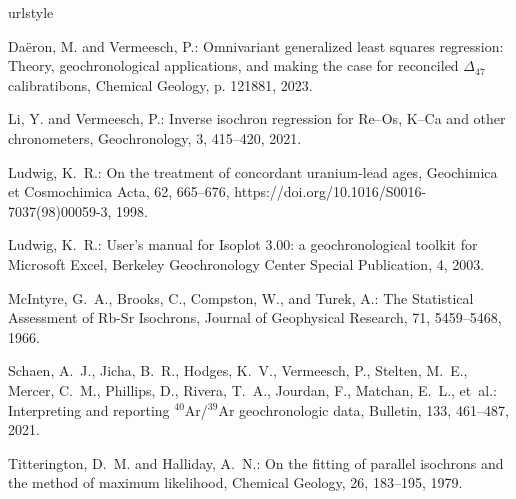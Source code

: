 \documentclass{article}
\begin{document}
%
%

\begin{thebibliography}{10}
\providecommand{\natexlab}[1]{#1}
\providecommand{\url}[1]{\texttt{#1}}
\providecommand{\urlprefix}{}
\expandafter\ifx\csname urlstyle\endcsname\relax
  \providecommand{\doi}[1]{https://doi.org/\discretionary{}{}{}#1}\else
  \providecommand{\doi}{https://doi.org/\discretionary{}{}{}\begingroup
  \urlstyle{rm}\Url}\fi

Da{\"e}ron, M. and Vermeesch, P.: {Omnivariant generalized least squares
  regression: Theory, geochronological applications, and making the case for
  reconciled $\Delta_{47}$ calibratibons}, Chemical Geology, p. 121881, 2023.

Li, Y. and Vermeesch, P.: Inverse isochron regression for Re--Os, K--Ca and
  other chronometers, Geochronology, 3, 415--420, 2021.

{Ludwig}, K.~R.: {On the treatment of concordant uranium-lead ages}, Geochimica
  et Cosmochimica Acta, 62, 665--676, \doi{10.1016/S0016-7037(98)00059-3},
  1998.

Ludwig, K.~R.: {User's manual for Isoplot 3.00: a geochronological toolkit for
  Microsoft Excel}, Berkeley Geochronology Center Special Publication, 4, 2003.

{McIntyre}, G.~A., {Brooks}, C., {Compston}, W., and {Turek}, A.: {The
  Statistical Assessment of Rb-Sr Isochrons}, Journal of Geophysical Research,
  71, 5459--5468, 1966.

Schaen, A.~J., Jicha, B.~R., Hodges, K.~V., Vermeesch, P., Stelten, M.~E.,
  Mercer, C.~M., Phillips, D., Rivera, T.~A., Jourdan, F., Matchan, E.~L.,
  et~al.: Interpreting and reporting $^{40}$Ar/$^{39}$Ar geochronologic data,
  Bulletin, 133, 461--487, 2021.

Titterington, D.~M. and Halliday, A.~N.: On the fitting of parallel isochrons
  and the method of maximum likelihood, Chemical Geology, 26, 183--195, 1979.


\end{thebibliography}
\end{document}
